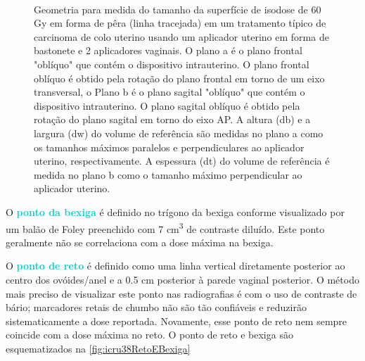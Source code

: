 \documentclass[11pt,a4paper]{article}
\begin{document}
	\begin{figure}[h]
		\centering
		 \\ %
		\caption{Geometria para medida do tamanho da superfície de isodose de 60 Gy em forma de pêra (linha tracejada) em um tratamento típico de carcinoma de colo uterino usando um aplicador uterino em forma de bastonete e 2 aplicadores vaginais. O plano a é o plano frontal "oblíquo" que contém o dispositivo intrauterino. O plano frontal oblíquo é obtido pela rotação do plano frontal em torno de um eixo transversal, o Plano b é o plano sagital "oblíquo" que contém o dispositivo intrauterino. O plano sagital oblíquo é obtido pela rotação do plano sagital em torno do eixo AP. A altura (db) e a largura (dw) do volume de referência são medidas no plano a como os tamanhos máximos paralelos e perpendiculares ao aplicador uterino, respectivamente. A espessura (dt) do volume de referência é medida no plano b como o tamanho máximo perpendicular ao aplicador uterino.}
		\label{fig:icru38Presc}
	\end{figure}

	O \textcolor{DarkTurquoise}{\textbf{ponto da bexiga}} é definido no trígono da bexiga conforme visualizado por um balão de Foley preenchido com 7 \unit{cm^3}  de contraste diluído. Este ponto geralmente não se correlaciona com a dose máxima na bexiga.
	
	O \textcolor{DarkTurquoise}{\textbf{ponto de reto}} é definido como uma linha vertical diretamente posterior ao centro dos ovóides/anel e a 0.5 cm posterior à parede vaginal posterior. O método mais preciso de visualizar este ponto nas radiografias é com o uso de contraste de bário; marcadores retais de chumbo não são tão confiáveis e reduzirão sistematicamente a dose reportada. Novamente, esse ponto de reto nem sempre coincide com a dose máxima no reto. O ponto de reto e bexiga são esquematizados na \ref{fig:icru38RetoEBexiga}
\end{document}
